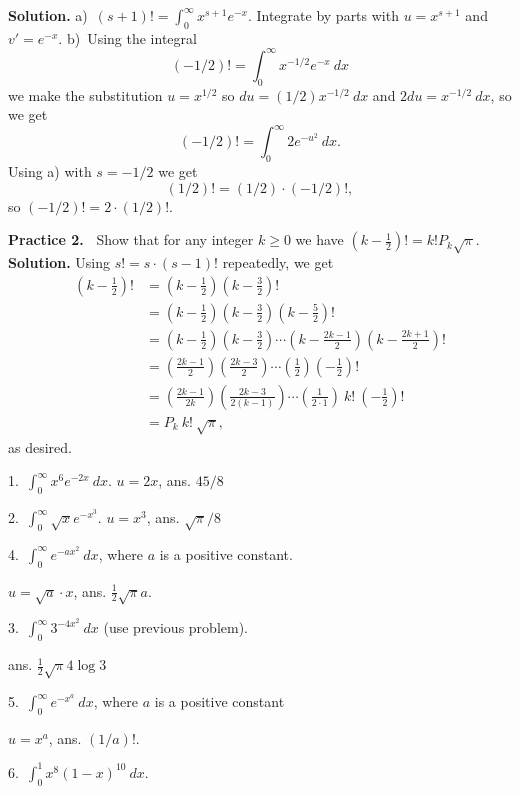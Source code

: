 \documentclass[12pt]{article}
\theoremstyle{definition}
\theoremstyle{remark}
\theoremstyle{definition}
\newenvironment{Solution}{\noindent\textbf{Solution.}}{}
\begin{document}
\begin{Solution} 
a)\ $(s+1)!=\int_0^\infty x^{s+1}e^{-x}$. Integrate by parts with $u=x^{s+1}$ and $v'=e^{-x}$. 
b)\ Using the integral
\[(-1/2)!=\int_0^\infty x^{-1/2}e^{-x}\ dx\]
we make the substitution $u=x^{1/2}$ so $du=(1/2)x^{-1/2}\ dx$ and 
$2du=x^{-1/2}\  dx$, so we get
\[(-1/2)!=\int_0^\infty 2e^{-u^2}\ dx.\]
Using a)  with $s=-1/2$ we get 
\[(1/2)!=(1/2)\cdot(-1/2)!,\]
so $(-1/2)!=2\cdot(1/2)!$.
\end{Solution}



\vskip10pt
{\bf Practice 2.\ } 
Show that for any integer $k\geq 0$ we have 
$\left(k-\frac{1}{2}\right)!= k! P_k \sqrt{\pi}.$
\begin{Solution} Using $s!=s\cdot(s-1)!$ repeatedly, we get
\[\begin{split}
\left(k-\frac{1}{2}\right)!
&=\left(k-\frac{1}{2}\right)\left(k-\frac{3}{2}\right)!\\
&=\left(k-\frac{1}{2}\right)\left(k-\frac{3}{2}\right)\left(k-\frac{5}{2}\right)!\\
&=\left(k-\frac{1}{2}\right)\left(k-\frac{3}{2}\right)\cdots
\left(k-\frac{2k-1}{2}\right)\left(k-\frac{2k+1}{2}\right)!\\
&=\left(\frac{2k-1}{2}\right)\left(\frac{2k-3}{2}\right)\cdots
\left(\frac{1}{2}\right)\left(-\frac{1}{2}\right)!\\
&=\left(\frac{2k-1}{2k}\right)\left(\frac{2k-3}{2(k-1)}\right)\cdots
\left(\frac{1}{2\cdot 1}\right)\ k!\  \left(-\frac{1}{2}\right)!\\
&=P_k\  k!\  \sqrt{\pi},
\end{split}
\]
as desired.
\end{Solution}

1.\ $\int_0^\infty x^6 e^{-2x}\ dx$.
 $u=2x$, ans. $45/8$

2.\ $\int_0^\infty \sqrt{x} e^{-x^3}$.
$u=x^3$, ans. $\sqrt{\pi}/8$

4.\ $\int_0^\infty e^{-ax^2}\ dx$, where $a$ is a positive constant.

$u=\sqrt a\cdot x$, ans. $\frac{1}{2}\sqrt{\pi}{a}$.

3.\ $\int_0^\infty 3^{-4x^2}\ dx$ (use previous problem). 

ans. $\frac{1}{2}\sqrt{\pi}{4\log 3}$

5.\ $\int_0^\infty e^{-x^a}\ dx$, where $a$ is a positive constant
 
 $u=x^a$, ans. $(1/a)!$.

6.\  $\int_0^1 x^8(1-x)^{10}\ dx$.
\end{document}
